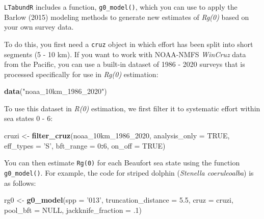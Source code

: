 \documentclass[
]{book}
\newenvironment{Shaded}{\begin{snugshade}}{\end{snugshade}}
\newcommand{\DataTypeTok}[1]{\textcolor[rgb]{0.13,0.29,0.53}{#1}}
\newcommand{\DecValTok}[1]{\textcolor[rgb]{0.00,0.00,0.81}{#1}}
\newcommand{\FloatTok}[1]{\textcolor[rgb]{0.00,0.00,0.81}{#1}}
\newcommand{\KeywordTok}[1]{\textcolor[rgb]{0.13,0.29,0.53}{\textbf{#1}}}
\newcommand{\NormalTok}[1]{#1}
\newcommand{\OperatorTok}[1]{\textcolor[rgb]{0.81,0.36,0.00}{\textbf{#1}}}
\newcommand{\OtherTok}[1]{\textcolor[rgb]{0.56,0.35,0.01}{#1}}
\newcommand{\StringTok}[1]{\textcolor[rgb]{0.31,0.60,0.02}{#1}}
\begin{document}
\texttt{LTabundR} includes a function, \texttt{g0\_model()}, which you can use to apply the Barlow (2015) modeling methods to generate new estimates of \emph{Rg(0)} based on your own survey data.

To do this, you first need a \texttt{cruz} object in which effort has been split into short segments (5 - 10 km). If you want to work with NOAA-NMFS \emph{WinCruz} data from the Pacific, you can use a built-in dataset of 1986 - 2020 surveys that is processed specifically for use in \emph{Rg(0)} estimation:

\begin{Shaded}
\begin{Highlighting}[]
\KeywordTok{data}\NormalTok{(}\StringTok{"noaa_10km_1986_2020"}\NormalTok{)}
\end{Highlighting}
\end{Shaded}

To use this dataset in \emph{R(0)} estimation, we first filter it to systematic effort within sea states 0 - 6:

\begin{Shaded}
\begin{Highlighting}[]
\NormalTok{cruzi <-}\StringTok{ }\KeywordTok{filter_cruz}\NormalTok{(noaa_10km_}\DecValTok{1986}\NormalTok{_}\DecValTok{2020}\NormalTok{,}
                     \DataTypeTok{analysis_only =} \OtherTok{TRUE}\NormalTok{,}
                     \DataTypeTok{eff_types =} \StringTok{'S'}\NormalTok{,}
                     \DataTypeTok{bft_range =} \DecValTok{0}\OperatorTok{:}\DecValTok{6}\NormalTok{,}
                     \DataTypeTok{on_off =} \OtherTok{TRUE}\NormalTok{)}
\end{Highlighting}
\end{Shaded}

You can then estimate \texttt{Rg(0)} for each Beaufort sea state using the function \texttt{g0\_model()}. For example, the code for striped dolphin (\emph{Stenella coeruleoalba}) is as follows:

\begin{Shaded}
\begin{Highlighting}[]
\NormalTok{rg0 <-}\StringTok{ }\KeywordTok{g0_model}\NormalTok{(}\DataTypeTok{spp =} \StringTok{'013'}\NormalTok{,}
                \DataTypeTok{truncation_distance =} \FloatTok{5.5}\NormalTok{,}
                \DataTypeTok{cruz =}\NormalTok{ cruzi,}
                \DataTypeTok{pool_bft =} \OtherTok{NULL}\NormalTok{,}
                \DataTypeTok{jackknife_fraction =} \FloatTok{.1}\NormalTok{)}
\end{Highlighting}
\end{Shaded}
\end{document}
